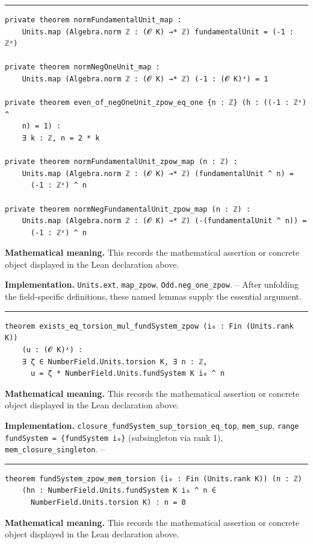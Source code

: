 \documentclass[UTF8,a4paper,11pt,fontset=fandol]{ctexart}
\theoremstyle{definition}
\newcommand{\statementsep}{\par\medskip\hrule\medskip}
\begin{document}
\statementsep
\begin{verbatim}
private theorem normFundamentalUnit_map :
    Units.map (Algebra.norm ℤ : (𝓞 K) →* ℤ) fundamentalUnit = (-1 : ℤˣ)

private theorem normNegOneUnit_map :
    Units.map (Algebra.norm ℤ : (𝓞 K) →* ℤ) (-1 : (𝓞 K)ˣ) = 1

private theorem even_of_negOneUnit_zpow_eq_one {n : ℤ} (h : ((-1 : ℤˣ) ^
    n) = 1) :
    ∃ k : ℤ, n = 2 * k

private theorem normFundamentalUnit_zpow_map (n : ℤ) :
    Units.map (Algebra.norm ℤ : (𝓞 K) →* ℤ) (fundamentalUnit ^ n) =
      (-1 : ℤˣ) ^ n

private theorem normNegFundamentalUnit_zpow_map (n : ℤ) :
    Units.map (Algebra.norm ℤ : (𝓞 K) →* ℤ) (-(fundamentalUnit ^ n)) =
      (-1 : ℤˣ) ^ n
\end{verbatim}
\noindent\textbf{Mathematical meaning.} This records the mathematical assertion or concrete object displayed in the Lean declaration above.\par
\noindent\textbf{Implementation.} \texttt{Units.\allowbreak{}ext}, \texttt{map\_\allowbreak{}zpow}, \texttt{Odd.\allowbreak{}neg\_\allowbreak{}one\_\allowbreak{}zpow}. -- After unfolding the field-specific definitions, these named lemmas supply the essential argument.\par
\statementsep
\begin{verbatim}
theorem exists_eq_torsion_mul_fundSystem_zpow (i₀ : Fin (Units.rank K))
    (u : (𝓞 K)ˣ) :
    ∃ ζ ∈ NumberField.Units.torsion K, ∃ n : ℤ,
      u = ζ * NumberField.Units.fundSystem K i₀ ^ n
\end{verbatim}
\noindent\textbf{Mathematical meaning.} This records the mathematical assertion or concrete object displayed in the Lean declaration above.\par
\noindent\textbf{Implementation.} \texttt{closure\_\allowbreak{}fundSystem\_\allowbreak{}sup\_\allowbreak{}torsion\_\allowbreak{}eq\_\allowbreak{}top}, \texttt{mem\_\allowbreak{}sup}, \texttt{range fundSystem = \{fundSystem i₀\}} (subsingleton via rank 1), \texttt{mem\_\allowbreak{}closure\_\allowbreak{}singleton}. --\par
\statementsep
\begin{verbatim}
theorem fundSystem_zpow_mem_torsion (i₀ : Fin (Units.rank K)) (n : ℤ)
    (hn : NumberField.Units.fundSystem K i₀ ^ n ∈
      NumberField.Units.torsion K) : n = 0
\end{verbatim}
\noindent\textbf{Mathematical meaning.} This records the mathematical assertion or concrete object displayed in the Lean declaration above.\par
\end{document}

